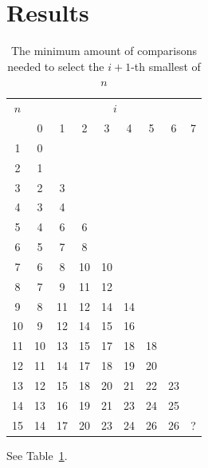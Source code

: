 \documentclass[10pt,journal,compsoc]{IEEEtran}
\begin{document}
\section{Results}

\begin{table}
  \centering
  \begin{tabular}{c|cccccccc}
    $n$ & \multicolumn{8}{c}{$i$}                                   \\
        & 0                       & 1  & 2  & 3  & 4  & 5  & 6  & 7 \\ \hline
    1   & 0                                                         \\
    2   & 1                                                         \\
    3   & 2                       & 3                               \\
    4   & 3                       & 4                               \\
    5   & 4                       & 6  & 6                          \\
    6   & 5                       & 7  & 8                          \\
    7   & 6                       & 8  & 10 & 10                    \\
    8   & 7                       & 9  & 11 & 12                    \\
    9   & 8                       & 11 & 12 & 14 & 14               \\
    10  & 9                       & 12 & 14 & 15 & 16               \\
    11  & 10                      & 13 & 15 & 17 & 18 & 18          \\
    12  & 11                      & 14 & 17 & 18 & 19 & 20          \\
    13  & 12                      & 15 & 18 & 20 & 21 & 22 & 23     \\
    14  & 13                      & 16 & 19 & 21 & 23 & 24 & 25     \\
    15  & 14                      & 17 & 20 & 23 & 24 & 26 & 26 & ? \\
  \end{tabular}
  \caption{The minimum amount of comparisons needed to select the $i+1$-th smallest of $n$}
  \label{table:num-comparisons}
\end{table}

See Table~\ref{table:num-comparisons}.
\end{document}
